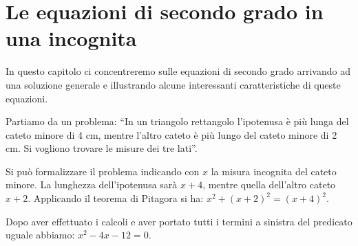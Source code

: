 %   

% 

\section{Le equazioni di secondo grado in una incognita}
\label{sec:eq2gr_definizione}

In questo capitolo ci concentreremo sulle equazioni di secondo grado 
arrivando ad una soluzione generale e illustrando alcune interessanti 
caratteristiche di queste equazioni.

{Partiamo da un problema: 
``In un triangolo rettangolo l'ipotenusa è 
più lunga del cateto minore di 4 cm, mentre l'altro cateto è più lungo del 
cateto minore di 2 cm. Si vogliono trovare le misure dei tre lati''.

Si può formalizzare il problema indicando con \(x\) la misura incognita del 
cateto minore. 
La lunghezza dell'ipotenusa sarà \(x +4\), mentre quella dell'altro 
cateto \(x +2\). 
Applicando il teorema di Pitagora si ha: 
\(x^2 +(x +2 )^2 = ( x +4 )^2\). }
{
\begin{center}

\end{center}
}
Dopo aver effettuato i calcoli e aver portato tutti i 
termini a sinistra del predicato uguale abbiamo: \(x^2-4x-12=0\).

